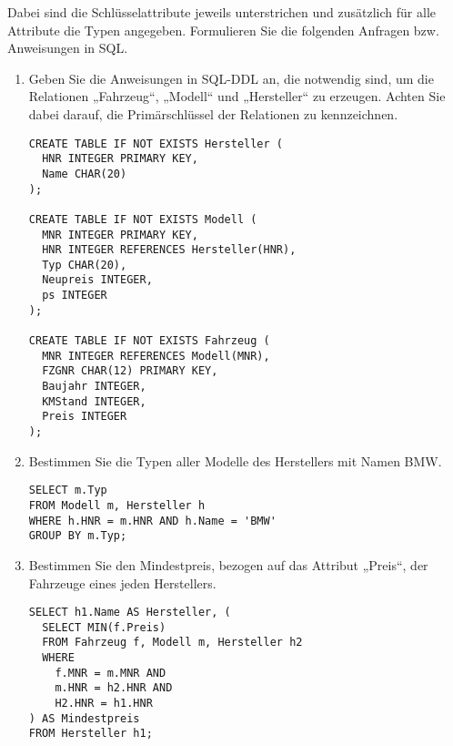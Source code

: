 \documentclass{bschlangaul-aufgabe}
\begin{document}
Dabei sind die Schlüsselattribute jeweils unterstrichen und zusätzlich
für alle Attribute die Typen angegeben. Formulieren Sie die folgenden
Anfragen bzw. Anweisungen in SQL.

\begin{enumerate}


\item Geben Sie die Anweisungen in SQL-DDL an, die notwendig sind, um
die Relationen „Fahrzeug“, „Modell“ und „Hersteller“ zu erzeugen. Achten
Sie dabei darauf, die Primärschlüssel der Relationen zu kennzeichnen.

\begin{liAntwort}
\begin{verbatim}
CREATE TABLE IF NOT EXISTS Hersteller (
  HNR INTEGER PRIMARY KEY,
  Name CHAR(20)
);

CREATE TABLE IF NOT EXISTS Modell (
  MNR INTEGER PRIMARY KEY,
  HNR INTEGER REFERENCES Hersteller(HNR),
  Typ CHAR(20),
  Neupreis INTEGER,
  ps INTEGER
);

CREATE TABLE IF NOT EXISTS Fahrzeug (
  MNR INTEGER REFERENCES Modell(MNR),
  FZGNR CHAR(12) PRIMARY KEY,
  Baujahr INTEGER,
  KMStand INTEGER,
  Preis INTEGER
);
\end{verbatim}
\end{liAntwort}


\item Bestimmen Sie die Typen aller Modelle des Herstellers mit Namen
BMW.

\begin{liAntwort}
\begin{verbatim}
SELECT m.Typ
FROM Modell m, Hersteller h
WHERE h.HNR = m.HNR AND h.Name = 'BMW'
GROUP BY m.Typ;
\end{verbatim}
\end{liAntwort}


\item Bestimmen Sie den Mindestpreis, bezogen auf das Attribut „Preis“,
der Fahrzeuge eines jeden Herstellers.

\begin{liAntwort}
\begin{verbatim}
SELECT h1.Name AS Hersteller, (
  SELECT MIN(f.Preis)
  FROM Fahrzeug f, Modell m, Hersteller h2
  WHERE
    f.MNR = m.MNR AND
    m.HNR = h2.HNR AND
    H2.HNR = h1.HNR
) AS Mindestpreis
FROM Hersteller h1;
\end{verbatim}
\end{liAntwort}


\end{enumerate}
\end{document}
